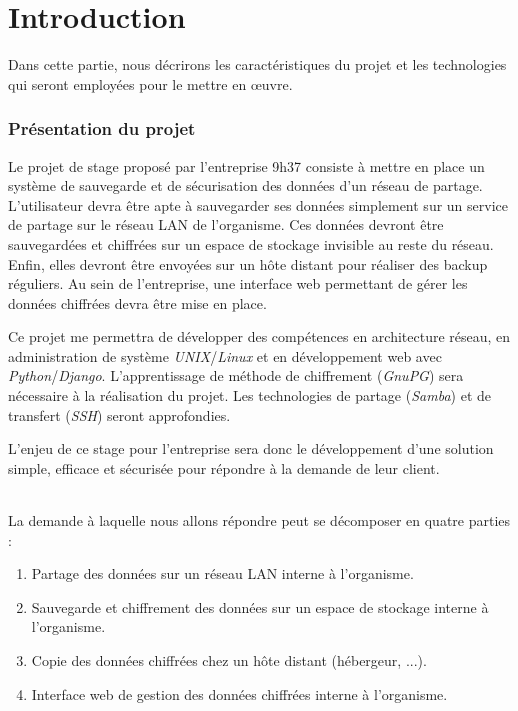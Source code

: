 \part{Introduction}

Dans cette partie, nous décrirons les caractéristiques du projet et les technologies qui seront
employées pour le mettre en \oe uvre.

\section{Présentation du projet}

Le projet de stage proposé par l'entreprise 9h37 consiste à mettre en place un système de
sauvegarde et de sécurisation des données d'un réseau de partage. L'utilisateur devra être
apte à sauvegarder ses données simplement sur un service de partage sur le réseau LAN de
l'organisme. Ces données devront être sauvegardées et chiffrées sur un espace de stockage invisible
au reste du réseau. Enfin, elles devront être envoyées sur un hôte distant pour réaliser des backup
réguliers. Au sein de l'entreprise, une interface web permettant de gérer les données chiffrées
devra être mise en place.

Ce projet me permettra de développer des compétences en architecture réseau, en administration
de système \textit{UNIX}/\textit{Linux} et en développement web avec \textit{Python}/\textit{Django}.
L'apprentissage de méthode de chiffrement (\textit{GnuPG}) sera nécessaire à la réalisation du projet.
Les technologies de partage (\textit{Samba}) et de transfert (\textit{SSH}) seront approfondies.

L'enjeu de ce stage pour l'entreprise sera donc le développement d'une solution simple, efficace
et sécurisée pour répondre à la demande de leur client.

\paragraph{}
La demande à laquelle nous allons répondre peut se décomposer en quatre parties :

\begin{enumerate}
     \item Partage des données sur un réseau LAN interne à l'organisme.
     \item Sauvegarde et chiffrement des données sur un espace de stockage interne à l'organisme.
     \item Copie des données chiffrées chez un hôte distant (hébergeur, ...).
     \item Interface web de gestion des données chiffrées interne à l'organisme.
\end{enumerate}

